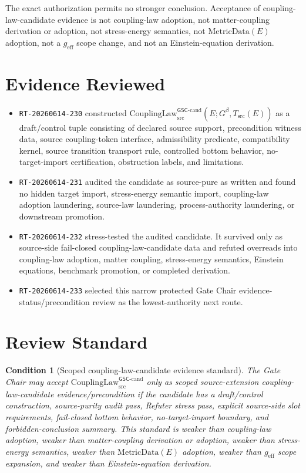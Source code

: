 \documentclass[11pt]{article}
\newcommand{\Gbeta}{G^\beta}
\newcommand{\geff}{g_{\mathrm{eff}}}
\newcommand{\CouplingLaw}{\mathrm{CouplingLaw}^{\mathsf{GSC}\mbox{-}\mathrm{cand}}_{\mathrm{src}}}
\newcommand{\MetricData}{\mathrm{MetricData}}
\newtheorem{condition}{Condition}
\begin{document}
The exact authorization permits no stronger conclusion. Acceptance of
coupling-law-candidate evidence is not coupling-law adoption, not
matter-coupling derivation or adoption, not stress-energy semantics, not
\(\MetricData(E)\) adoption, not a \(\geff\) scope change, and not an
Einstein-equation derivation.

\section{Evidence Reviewed}

\begin{itemize}[leftmargin=*]
  \item \texttt{RT-20260614-230} constructed
  \(\CouplingLaw(E;\Gbeta,T_{\mathrm{src}}(E))\) as a draft/control tuple
  consisting of declared source support, precondition witness data, source
  coupling-token interface, admissibility predicate, compatibility kernel,
  source transition transport rule, controlled bottom behavior,
  no-target-import certification, obstruction labels, and limitations.
  \item \texttt{RT-20260614-231} audited the candidate as source-pure as
  written and found no hidden target import, stress-energy semantic import,
  coupling-law adoption laundering, source-law laundering, process-authority
  laundering, or downstream promotion.
  \item \texttt{RT-20260614-232} stress-tested the audited candidate. It
  survived only as source-side fail-closed coupling-law-candidate data and
  refuted overreads into coupling-law adoption, matter coupling,
  stress-energy semantics, Einstein equations, benchmark promotion, or
  completed derivation.
  \item \texttt{RT-20260614-233} selected this narrow protected Gate Chair
  evidence-status/precondition review as the lowest-authority next route.
\end{itemize}

\section{Review Standard}

\begin{condition}[Scoped coupling-law-candidate evidence standard]
The Gate Chair may accept \(\CouplingLaw\) only as scoped source-extension
coupling-law-candidate evidence/precondition if the candidate has a
draft/control construction, source-purity audit pass, Refuter stress pass,
explicit source-side slot requirements, fail-closed bottom behavior,
no-target-import boundary, and forbidden-conclusion summary. This standard is
weaker than coupling-law adoption, weaker than matter-coupling derivation or
adoption, weaker than stress-energy semantics, weaker than \(\MetricData(E)\)
adoption, weaker than \(\geff\) scope expansion, and weaker than
Einstein-equation derivation.
\end{condition}
\end{document}
